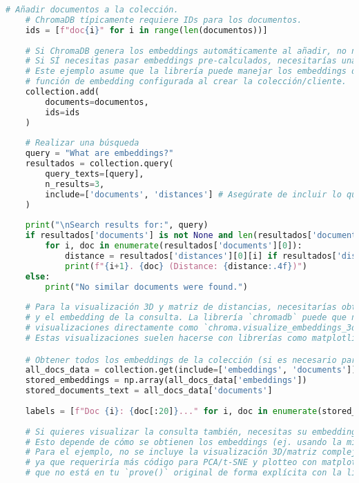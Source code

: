 \begin{lstlisting}[language=Python, caption={Script de Python para la prueba de concepto con ChromaDB.}, label={lst:chroma_prove_code}]
    # Añadir documentos a la colección.
    # ChromaDB típicamente requiere IDs para los documentos.
    ids = [f"doc{i}" for i in range(len(documentos))]
    
    # Si ChromaDB genera los embeddings automáticamente al añadir, no necesitas pasarlos explícitamente.
    # Si SÍ necesitas pasar embeddings pre-calculados, necesitarías una función para ello.
    # Este ejemplo asume que la librería puede manejar los embeddings directamente o con una
    # función de embedding configurada al crear la colección/cliente.
    collection.add(
        documents=documentos,
        ids=ids
    )
    
    # Realizar una búsqueda
    query = "What are embeddings?"
    resultados = collection.query(
        query_texts=[query],
        n_results=3,
        include=['documents', 'distances'] # Asegúrate de incluir lo que necesitas
    )
    
    print("\nSearch results for:", query)
    if resultados['documents'] is not None and len(resultados['documents'][0]) > 0:
        for i, doc in enumerate(resultados['documents'][0]):
            distance = resultados['distances'][0][i] if resultados['distances'] else 'N/A'
            print(f"{i+1}. {doc} (Distance: {distance:.4f})")
    else:
        print("No similar documents were found.")
    
    # Para la visualización 3D y matriz de distancias, necesitarías obtener todos los embeddings
    # y el embedding de la consulta. La librería `chromadb` puede que no ofrezca estas
    # visualizaciones directamente como `chroma.visualize_embeddings_3d`.
    # Estas visualizaciones suelen hacerse con librerías como matplotlib, plotly, scikit-learn (para PCA/t-SNE).

    # Obtener todos los embeddings de la colección (si es necesario para visualización manual)
    all_docs_data = collection.get(include=['embeddings', 'documents'])
    stored_embeddings = np.array(all_docs_data['embeddings'])
    stored_documents_text = all_docs_data['documents']
    
    labels = [f"Doc {i}: {doc[:20]}..." for i, doc in enumerate(stored_documents_text)]
    
    # Si quieres visualizar la consulta también, necesitas su embedding
    # Esto depende de cómo se obtienen los embeddings (ej. usando la misma embedding function)
    # Para el ejemplo, no se incluye la visualización 3D/matriz compleja aquí
    # ya que requeriría más código para PCA/t-SNE y plotteo con matplotlib/plotly
    # que no está en tu `prove()` original de forma explícita con la librería `chromadb`.
    

\end{lstlisting}
